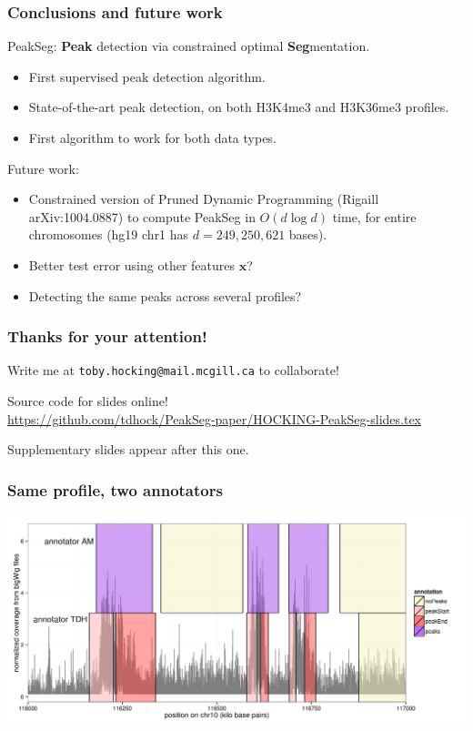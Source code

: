 \documentclass{beamer}
\begin{document}
\begin{frame}
  \frametitle{Conclusions and future work}
  PeakSeg: \textbf{Peak} detection via constrained optimal
  \textbf{Seg}mentation.
  \begin{itemize}
  \item First supervised peak detection algorithm.
  \item State-of-the-art peak detection, on both H3K4me3 and H3K36me3
    profiles.
  \item First algorithm to work for both data types.
  \end{itemize}
  Future work:
  \begin{itemize}
  \item Constrained version of Pruned Dynamic Programming (Rigaill
    arXiv:1004.0887) to compute PeakSeg in $O(d\log d)$ time, for
    entire chromosomes (hg19 chr1 has $d=249,250,621$ bases).
  \item Better test error using other features $\mathbf x$?
  \item Detecting the same peaks across several profiles?
  \end{itemize}
\end{frame}


\begin{frame}
  \frametitle{Thanks for your attention!}
  Write me at \alert{\texttt{toby.hocking@mail.mcgill.ca}} to collaborate!

  \vskip 1cm

  Source code for slides online!\\
  \small
  \url{https://github.com/tdhock/PeakSeg-paper/HOCKING-PeakSeg-slides.tex}
  \vskip 1cm

  Supplementary slides appear after this one.

\end{frame}


\begin{frame}
  \frametitle{Same profile, two annotators}
  \includegraphics[width=1.1\textwidth]{figure-several-annotators}
\end{frame}
\end{document}
